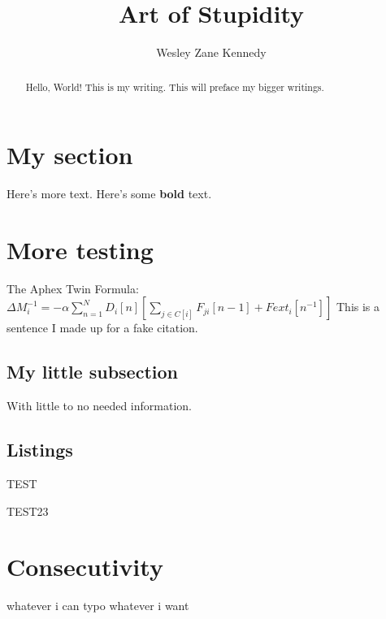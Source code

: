 \documentclass[]{article}
\title{Art of Stupidity}
\author{Wesley Zane Kennedy}
\begin{document}
\maketitle

\begin{abstract}

Hello, World! This is my writing.
This will preface my bigger writings.

\end{abstract}

\tableofcontents

\section{My section}

Here's more text.\newline
Here's some \textbf{bold} text.

\section{More testing}

The Aphex Twin Formula:\newline
$ \Delta M_i^{-1} = - \alpha \sum_{n=1}^N D_i \left[ n \right] \left[ \sum_{j \in C \left[ i \right]}^{} F_{ji} \left[ n -1 \right] + Fext_i \left[ n^{-1} \right] 
\right] $\cite{afxtex}
\newline
This is a sentence I made up for a fake citation.\cite{fakeref}

\subsection{My little subsection}

With little to no needed information.

\subsection{Listings}

\begin{list}{-}
	\item TEST
	\item TEST23
\end{list}

\section{Consecutivity}
\small{whatever i can typo whatever i want}
\end{document}
